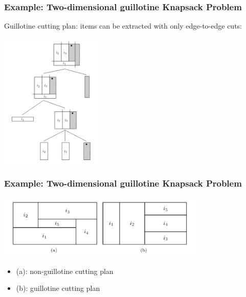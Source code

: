 \documentclass[10pt]{beamer}
\begin{document}
\begin{frame}
  \frametitle{Example: Two-dimensional guillotine Knapsack Problem}

  Guillotine cutting plan: items can be extracted with only edge-to-edge cuts:
  \begin{center}
    \includegraphics[width=5cm]{guillotine.png}
  \end{center}
\end{frame}

\begin{frame}
  \frametitle{Example: Two-dimensional guillotine Knapsack Problem}

  \begin{center}
    \includegraphics[width=10cm]{non-guillotine.png}
  \end{center}
  \begin{itemize}
    \item (a): non-guillotine cutting plan
    \item (b): guillotine cutting plan
  \end{itemize}
\end{frame}
\end{document}
